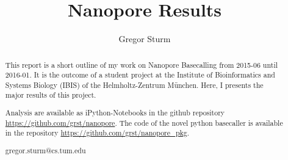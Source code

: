 \documentclass[]{scrartcl}
\title{Nanopore Results %
}
\author{Gregor Sturm}
\begin{document}
\maketitle

\begin{abstract}
\begin{description}
\item This report is a short outline of my work on Nanopore Basecalling from 2015-06 until 2016-01. It is the outcome of a student project at the Institute of Bioinformatics and Systems Biology (IBIS) of the Helmholtz-Zentrum München. Here, I presents the major results of this project. 
\item [Availability] Analysis are available as iPython-Notebooks in the github repository \url{https://github.com/grst/nanopore}. The code of the novel python basecaller is available in the repository \url{https://github.com/grst/nanopore\_pkg}. 
\item [Contact] gregor.sturm@cs.tum.edu
\end{description}

\end{abstract}
\end{document}
